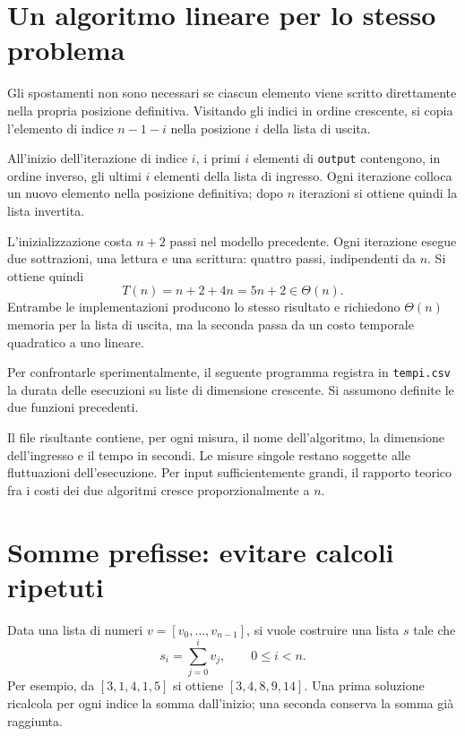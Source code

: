 \section{Un algoritmo lineare per lo stesso problema}
\label{sec:fi-complessita-reverse-lineare}

Gli spostamenti non sono necessari se ciascun elemento viene scritto
direttamente nella propria posizione definitiva. Visitando gli indici
in ordine crescente, si copia l'elemento di indice \(n-1-i\) nella
posizione \(i\) della lista di uscita.



All'inizio dell'iterazione di indice \(i\), i primi \(i\) elementi di
\texttt{output} contengono, in ordine inverso, gli ultimi \(i\) elementi
della lista di ingresso. Ogni iterazione colloca un nuovo elemento
nella posizione definitiva; dopo \(n\) iterazioni si ottiene quindi
la lista invertita.

L'inizializzazione costa \(n+2\) passi nel modello precedente. Ogni
iterazione esegue due sottrazioni, una lettura e una scrittura: quattro
passi, indipendenti da \(n\). Si ottiene quindi
\[
  T(n)=n+2+4n=5n+2\in\Theta(n).
\]
Entrambe le implementazioni producono lo stesso risultato e richiedono
\(\Theta(n)\) memoria per la lista di uscita, ma la seconda passa da
un costo temporale quadratico a uno lineare.

Per confrontarle sperimentalmente, il seguente programma registra in
\texttt{tempi.csv} la durata delle esecuzioni su liste di dimensione
crescente. Si assumono definite le due funzioni precedenti.



Il file risultante contiene, per ogni misura, il nome dell'algoritmo,
la dimensione dell'ingresso e il tempo in secondi. Le misure
singole restano soggette alle fluttuazioni dell'esecuzione.
Per input sufficientemente grandi, il rapporto teorico fra i costi dei
due algoritmi cresce proporzionalmente a \(n\).

\section{Somme prefisse: evitare calcoli ripetuti}
\label{sec:fi-complessita-somme-prefisse}

Data una lista di numeri \(v=[v_0,\ldots,v_{n-1}]\), si vuole
costruire una lista \(s\) tale che
\[
  s_i=\sum_{j=0}^{i}v_j,\qquad 0\le i<n.
\]
Per esempio, da \([3,1,4,1,5]\) si ottiene
\([3,4,8,9,14]\). Una prima soluzione ricalcola per ogni indice
la somma dall'inizio; una seconda conserva la somma già raggiunta.

